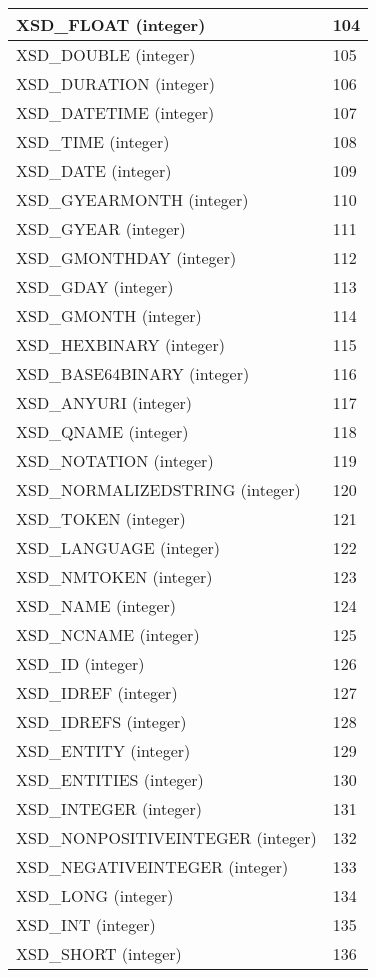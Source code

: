 \begin{longtable}{|m{150pt}|m{100pt}|}
\hline
XSD\_FLOAT (integer)	&104	 \\
\hline
XSD\_DOUBLE (integer)	&105	 \\
\hline
XSD\_DURATION (integer)	&106	 \\
\hline
XSD\_DATETIME (integer)	&107	 \\
\hline
XSD\_TIME (integer)	&108	 \\
\hline
XSD\_DATE (integer)	&109	 \\
\hline
XSD\_GYEARMONTH (integer)	&110	 \\
\hline
XSD\_GYEAR (integer)	&111	 \\
\hline
XSD\_GMONTHDAY (integer)	&112	 \\
\hline
XSD\_GDAY (integer)	&113	 \\
\hline
XSD\_GMONTH (integer)	&114	 \\
\hline
XSD\_HEXBINARY (integer)	&115	 \\
\hline
XSD\_BASE64BINARY (integer)	&116	 \\
\hline
XSD\_ANYURI (integer)	&117	 \\
\hline
XSD\_QNAME (integer)	&118	 \\
\hline
XSD\_NOTATION (integer)	&119	 \\
\hline
XSD\_NORMALIZEDSTRING (integer)	&120	 \\
\hline
XSD\_TOKEN (integer)	&121	 \\
\hline
XSD\_LANGUAGE (integer)	&122	 \\
\hline
XSD\_NMTOKEN (integer)	&123	 \\
\hline
XSD\_NAME (integer)	&124	 \\
\hline
XSD\_NCNAME (integer)	&125	 \\
\hline
XSD\_ID (integer)	&126	 \\
\hline
XSD\_IDREF (integer)	&127	 \\
\hline
XSD\_IDREFS (integer)	&128	 \\
\hline
XSD\_ENTITY (integer)	&129	 \\
\hline
XSD\_ENTITIES (integer)	&130	 \\
\hline
XSD\_INTEGER (integer)	&131	 \\
\hline
XSD\_NONPOSITIVEINTEGER (integer)	&132	 \\
\hline
XSD\_NEGATIVEINTEGER (integer)	&133	 \\
\hline
XSD\_LONG (integer)	&134	 \\
\hline
XSD\_INT (integer)	&135	 \\
\hline
XSD\_SHORT (integer)	&136	 \\

\end{longtable}
